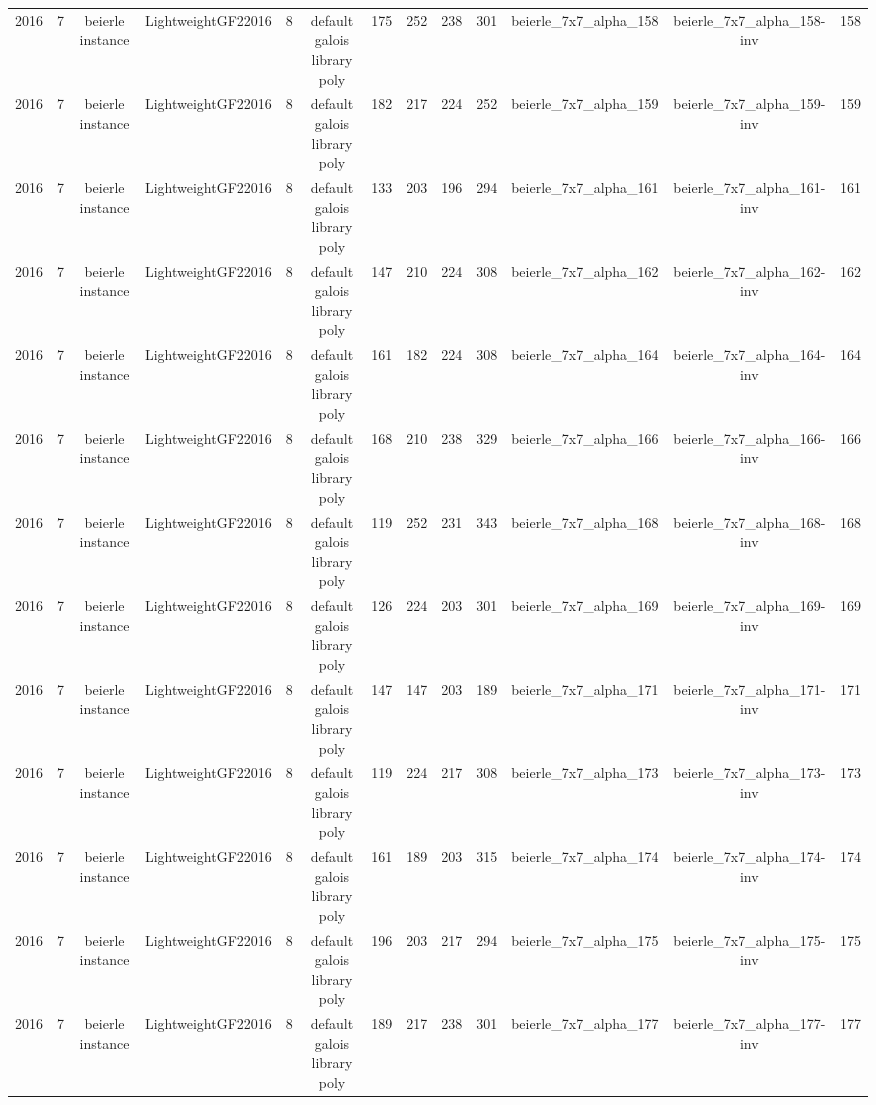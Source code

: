 \begin{tabular}{c c c c c c c c c c c c c}
2016 & 7 & beierle instance & LightweightGF22016 & 8 & default galois library poly & 175 & 252 & 238 & 301 & beierle_7x7_alpha_158 & beierle_7x7_alpha_158-inv & 158 \\
2016 & 7 & beierle instance & LightweightGF22016 & 8 & default galois library poly & 182 & 217 & 224 & 252 & beierle_7x7_alpha_159 & beierle_7x7_alpha_159-inv & 159 \\
2016 & 7 & beierle instance & LightweightGF22016 & 8 & default galois library poly & 133 & 203 & 196 & 294 & beierle_7x7_alpha_161 & beierle_7x7_alpha_161-inv & 161 \\
2016 & 7 & beierle instance & LightweightGF22016 & 8 & default galois library poly & 147 & 210 & 224 & 308 & beierle_7x7_alpha_162 & beierle_7x7_alpha_162-inv & 162 \\
2016 & 7 & beierle instance & LightweightGF22016 & 8 & default galois library poly & 161 & 182 & 224 & 308 & beierle_7x7_alpha_164 & beierle_7x7_alpha_164-inv & 164 \\
2016 & 7 & beierle instance & LightweightGF22016 & 8 & default galois library poly & 168 & 210 & 238 & 329 & beierle_7x7_alpha_166 & beierle_7x7_alpha_166-inv & 166 \\
2016 & 7 & beierle instance & LightweightGF22016 & 8 & default galois library poly & 119 & 252 & 231 & 343 & beierle_7x7_alpha_168 & beierle_7x7_alpha_168-inv & 168 \\
2016 & 7 & beierle instance & LightweightGF22016 & 8 & default galois library poly & 126 & 224 & 203 & 301 & beierle_7x7_alpha_169 & beierle_7x7_alpha_169-inv & 169 \\
2016 & 7 & beierle instance & LightweightGF22016 & 8 & default galois library poly & 147 & 147 & 203 & 189 & beierle_7x7_alpha_171 & beierle_7x7_alpha_171-inv & 171 \\
2016 & 7 & beierle instance & LightweightGF22016 & 8 & default galois library poly & 119 & 224 & 217 & 308 & beierle_7x7_alpha_173 & beierle_7x7_alpha_173-inv & 173 \\
2016 & 7 & beierle instance & LightweightGF22016 & 8 & default galois library poly & 161 & 189 & 203 & 315 & beierle_7x7_alpha_174 & beierle_7x7_alpha_174-inv & 174 \\
2016 & 7 & beierle instance & LightweightGF22016 & 8 & default galois library poly & 196 & 203 & 217 & 294 & beierle_7x7_alpha_175 & beierle_7x7_alpha_175-inv & 175 \\
2016 & 7 & beierle instance & LightweightGF22016 & 8 & default galois library poly & 189 & 217 & 238 & 301 & beierle_7x7_alpha_177 & beierle_7x7_alpha_177-inv & 177 \\

\end{tabular}
